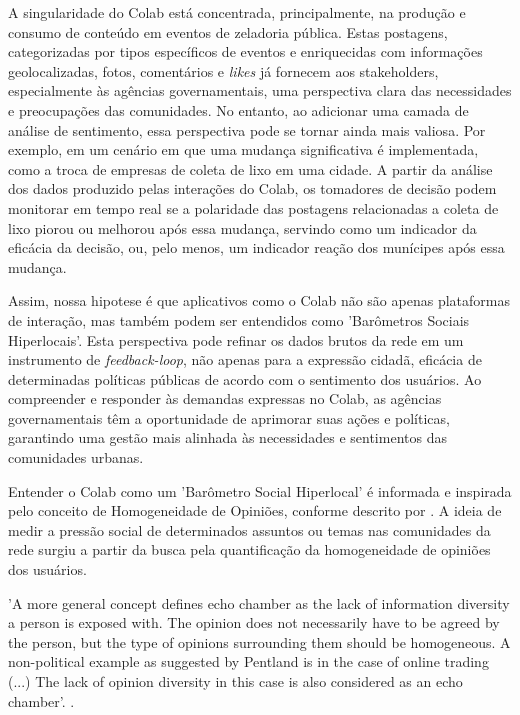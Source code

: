 A singularidade do Colab está concentrada, principalmente, na produção e consumo de conteúdo em eventos de zeladoria pública. Estas postagens, categorizadas por tipos específicos de eventos e enriquecidas com informações geolocalizadas, fotos, comentários e \textit{likes} já fornecem aos stakeholders, especialmente às agências governamentais, uma perspectiva clara das necessidades e preocupações das comunidades. No entanto, ao adicionar uma camada de análise de sentimento, essa perspectiva pode se tornar ainda mais valiosa. Por exemplo, em um cenário em que uma mudança significativa é implementada, como a troca de empresas de coleta de lixo em uma cidade. A partir da análise dos dados produzido pelas interações do Colab, os tomadores de decisão podem monitorar em tempo real se a polaridade das postagens relacionadas a coleta de lixo piorou ou melhorou após essa mudança, servindo como um indicador da eficácia da decisão, ou, pelo menos, um indicador reação dos munícipes após essa mudança.

Assim, nossa hipotese é que aplicativos como o Colab não são apenas plataformas de interação, mas também podem ser entendidos como 'Barômetros Sociais Hiperlocais'. Esta perspectiva pode refinar os dados brutos da rede em um instrumento de \textit{feedback-loop}, não apenas para a expressão cidadã, eficácia de determinadas políticas públicas de acordo com o sentimento dos usuários. Ao compreender e responder às demandas expressas no Colab, as agências governamentais têm a oportunidade de aprimorar suas ações e políticas, garantindo uma gestão mais alinhada às necessidades e sentimentos das comunidades urbanas.

Entender o Colab como um 'Barômetro Social Hiperlocal' é informada e inspirada pelo conceito de Homogeneidade de Opiniões, conforme descrito por . A ideia de medir a pressão social de determinados assuntos ou temas nas comunidades da rede surgiu a partir da busca pela quantificação da homogeneidade de opiniões dos usuários.

\begin{citacao}
	'A more general concept defines echo chamber as the lack of information diversity a person is exposed with. The opinion does not necessarily have to be agreed by the person, but the type of opinions surrounding them should be homogeneous. A non-political example as suggested by Pentland is in the case of online trading (...) The lack of opinion diversity in this case is also considered as an echo chamber'. \cite[p. 17]{2023_Atiqi_BOOK}.
\end{citacao}


